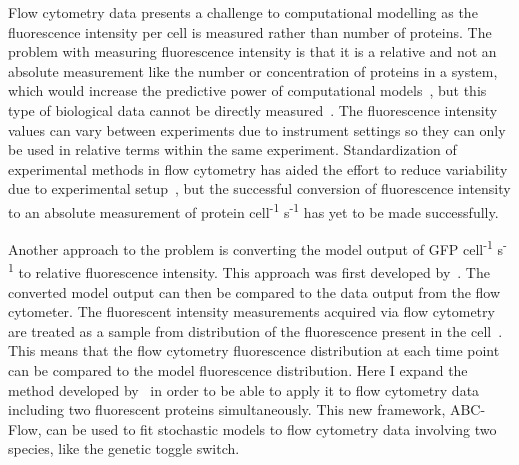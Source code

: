 Flow cytometry data presents a challenge to computational modelling as the fluorescence intensity per cell is measured rather than number of proteins. The problem with measuring fluorescence intensity is that it is a relative and not an absolute measurement like the number or concentration of proteins in a system, which would increase the predictive power of computational models~\autocite{Bower:2010jl, Cooling:2010bx}, but this type of biological data cannot be directly measured~\autocite{Kelwick:2014iy}. The fluorescence intensity values can vary between experiments due to instrument settings so they can only be used in relative terms within the same experiment. Standardization of experimental methods in flow cytometry has aided the effort to reduce variability due to experimental setup~\autocite{Kelly:2009bj}, but the successful conversion of fluorescence intensity to an absolute measurement of protein cell\textsuperscript{-1} s\textsuperscript{-1} has yet to be made successfully. 



Another approach to the problem is converting the model output of GFP cell\textsuperscript{-1} s\textsuperscript{-1} to relative fluorescence intensity. This approach was first developed by~\textcite{Lillacci:2013hu}. The converted model output can then be compared to the data output from the flow cytometer. The fluorescent intensity measurements acquired via flow cytometry are treated as a sample from distribution of the fluorescence present in the cell~\autocite{Lillacci:2013hu}. This means that the flow cytometry fluorescence distribution at each time point can be compared to the model fluorescence distribution. Here I expand the method developed by~\textcite{Lillacci:2013hu} in order to be able to apply it to flow cytometry data including two fluorescent proteins simultaneously. This new framework, ABC-Flow, can be used to fit stochastic models to flow cytometry data involving two species, like the genetic toggle switch. 





